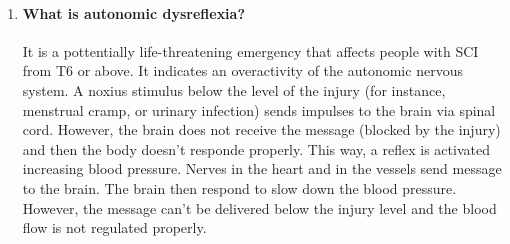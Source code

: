 \documentclass[12pt,article,oneside,a4paper]{memoir}
\begin{document}
\begin{enumerate}
\item \paragraph{What is autonomic dysreflexia?}
It is a pottentially life-threatening emergency that affects people with SCI
from T6 or above. It indicates an overactivity of the autonomic nervous system.
A noxius stimulus below the level of the injury (for instance, menstrual cramp,
or urinary infection) sends impulses to the brain via spinal cord. However, the
brain does not receive the message (blocked by the injury) and then the body
doesn't responde properly. This way, a reflex is activated increasing blood
pressure. Nerves in the heart and in the vessels send message to the brain. The
brain then respond to slow down the blood pressure. However, the message can't
be delivered below the injury level and the blood flow is not regulated
properly.

\end{enumerate}

\end{document}
